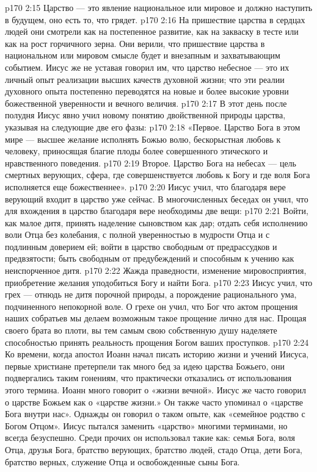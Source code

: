 \vs p170 2:15 \bibnobreakspace Царство --- это явление национальное или мировое и должно наступить в будущем, оно есть то, что грядет.
\vs p170 2:16 \pc На пришествие царства в сердцах людей они смотрели как на постепенное развитие, как на закваску в тесте или как на рост горчичного зерна. Они верили, что пришествие царства в национальном или мировом смысле будет и внезапным и захватывающим событием. Иисус же не уставая говорил им, что царство небесное --- это их личный опыт реализации высших качеств духовной жизни; что эти реалии духовного опыта постепенно переводятся на новые и более высокие уровни божественной уверенности и вечного величия.
\vs p170 2:17 В этот день после полудня Иисус явно учил новому понятию двойственной природы царства, указывая на следующие две его фазы:
\vs p170 2:18 «Первое. Царство Бога в этом мире --- высшее желание исполнять Божью волю, бескорыстная любовь к человеку, приносящая благие плоды более совершенного этического и нравственного поведения.
\vs p170 2:19 Второе. Царство Бога на небесах --- цель смертных верующих, сфера, где совершенствуется любовь к Богу и где воля Бога исполняется еще божественнее».
\vs p170 2:20 Иисус учил, что благодаря вере верующий входит в царство уже сейчас. В многочисленных беседах он учил, что для вхождения в царство благодаря вере необходимы две вещи:
\vs p170 2:21 \pc {}\bibnobreakspace {} Войти, как малое дитя, принять наделение сыновством как дар; отдать себя исполнению воли Отца без колебания, с полной уверенностью в мудрости Отца и с подлинным доверием ей; войти в царство свободным от предрассудков и предвзятости; быть свободным от предубеждений и способным к учению как неиспорченное дитя.
\vs p170 2:22 \pc {}\bibnobreakspace {} Жажда праведности, изменение мировосприятия, приобретение желания уподобиться Богу и найти Бога.
\vs p170 2:23 Иисус учил, что грех --- отнюдь не дитя порочной природы, а порождение рационального ума, подчиненного непокорной воле. О грехе он учил, что Бог  что актом прощения наших собратьев мы делаем возможным такое прощение лично для нас. Прощая своего брата во плоти, вы тем самым свою собственную душу наделяете способностью принять реальность прощения Богом ваших проступков.
\vs p170 2:24 Ко времени, когда апостол Иоанн начал писать историю жизни и учений Иисуса, первые христиане претерпели так много бед за идею царства Божьего, они подвергались таким гонениям, что практически отказались от использования этого термина. Иоанн много говорит о «жизни вечной». Иисус же часто говорил о царстве Божьем как о «царстве жизни.» Он также часто упоминал о «царстве Бога внутри нас». Однажды он говорил о таком опыте, как «семейное родство с Богом Отцом». Иисус пытался заменить «царство» многими терминами, но всегда безуспешно. Среди прочих он использовал такие как: семья Бога, воля Отца, друзья Бога, братство верующих, братство людей, стадо Отца, дети Бога, братство верных, служение Отца и освобожденные сыны Бога.
